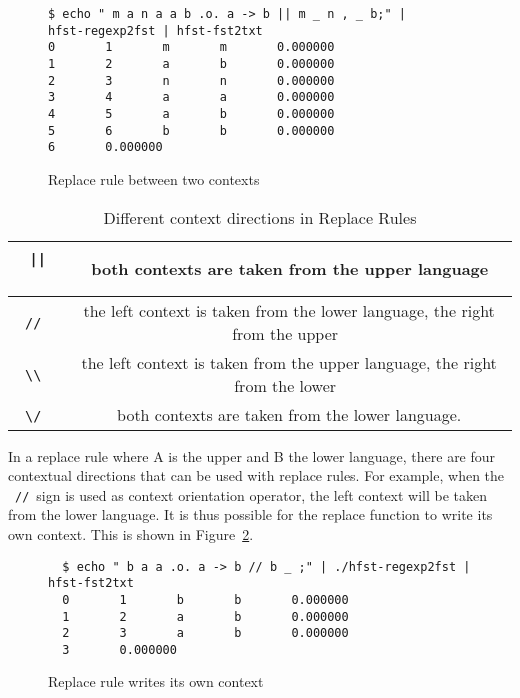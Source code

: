 \documentclass{llncs}
\begin{document}
\begin{figure} [h!]
{\scriptsize
\begin{verbatim}
$ echo " m a n a a b .o. a -> b || m _ n , _ b;" |
hfst-regexp2fst | hfst-fst2txt
0       1       m       m       0.000000
1       2       a       b       0.000000
2       3       n       n       0.000000
3       4       a       a       0.000000
4       5       a       b       0.000000
5       6       b       b       0.000000
6       0.000000
\end{verbatim}
}
\caption{Replace rule between two contexts}
\label{fig:multiple_contexts}
\end{figure}

\begin{table} [h!]
  \centering
  \caption{Different context directions in Replace Rules}
  \begin{tabular}{ | c | c | }
    \hline
    \ \verb!||!\ & \ both contexts are taken from the upper language \\ \hline
    \ \verb!//!\ & \ the left context is taken from the lower language, the right from the upper \\ \hline
    \ \verb!\\!\ & \ the left context is taken from the upper language, the right from the lower \\ \hline
    \ \verb!\/!\ & \ both contexts are taken from the lower language. \\ \hline
  \end{tabular}
  \label{tab:context_directions}
\end{table}

In a replace rule where A is the upper and B the lower language, 
there are four contextual directions that can be used with replace rules.
For example, when the \ \verb!//!\ sign is used as context orientation operator, 
the left context will be taken from the lower language. 
It is thus possible for the replace function to write its own context. 
This is shown in Figure~\ref{fig:context_orientation}. 

\begin{figure} [h!]
{\scriptsize
\begin{verbatim}
  $ echo " b a a .o. a -> b // b _ ;" | ./hfst-regexp2fst | hfst-fst2txt
  0       1       b       b       0.000000
  1       2       a       b       0.000000
  2       3       a       b       0.000000
  3       0.000000
\end{verbatim}
}
\caption{Replace rule writes its own context}
\label{fig:context_orientation}
\end{figure}
\end{document}
